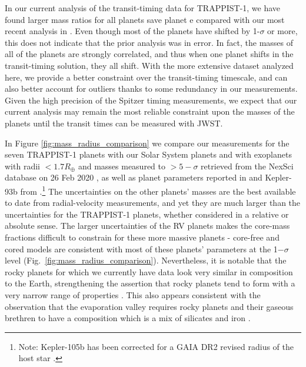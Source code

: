 \documentclass[twocolumn]{aastex63}
\begin{document}
In our current analysis of the transit-timing data
for TRAPPIST-1, we have found larger mass ratios for
all planets save planet e compared with our most
recent analysis in \citet{Grimm2018}.  Even though
most of the planets have shifted by 1-$\sigma$ or more,
this does not indicate that the prior analysis was in
error.  In fact, the masses of all of the planets
are strongly correlated, and thus when one planet shifts
in the transit-timing solution, they all shift.  With
the more extensive dataset analyzed here, we provide
a better constraint over the transit-timing timescale,
and can also better account for outliers thanks to some
redundancy in our measurements. Given the high precision of
the Spitzer timing measurements, we expect that our current 
analysis may remain the most reliable constraint upon the 
masses of the planets until the transit times can be measured 
with JWST.




In Figure \ref{fig:mass_radius_comparison} we compare our measurements for
the seven TRAPPIST-1 planets with our Solar System planets and with exoplanets
with radii ${<}1.7 R_\oplus$ and masses measured to ${>}5-\sigma$ retrieved from
the NexSci database on 26 Feb 2020 \citep{Akeson2013,Christiansen2018}, as well
as planet parameters reported in \citet{Dai2019} and Kepler-93b from \citet{Dressing2015}.\footnote{Note: Kepler-105b has been corrected for a GAIA DR2 revised radius of
    the host star \citep{Berger2018,Fulton2018}.}   The uncertainties
on the other planets' masses are the best available to date from radial-velocity measurements, and yet they are much larger than the uncertainties for the TRAPPIST-1 planets, whether considered in
a relative or absolute sense.  The larger uncertainties of the RV planets makes the core-mass fractions difficult to constrain
for these more massive planets - core-free and cored models are consistent with most of these planets' parameters at the 1$-\sigma$ level (Fig.\ \ref{fig:mass_radius_comparison}).   Nevertheless, it is notable that the
rocky planets for which we currently have data look very similar in composition to the
Earth, strengthening the assertion that rocky planets tend to form with a very
narrow range of properties \citep{Dressing2015}.
This also appears consistent with the observation
that the evaporation valley requires rocky planets and their gaseous brethren to have 
a composition which is a mix of silicates and iron \citep{Owen2017}.
\end{document}
